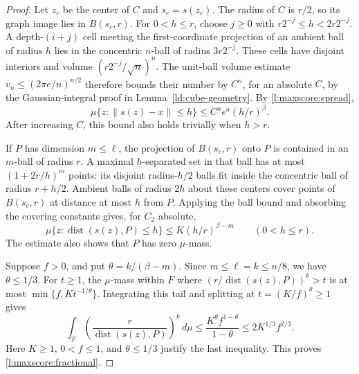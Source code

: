 \begin{proof}
Let \(z_c\) be the center of \(C\) and \(s_c=s(z_c)\).
The radius of \(C\) is \(r/2\), so its graph image lies in
\(B(s_c,r)\).  For \(0<h\le r\), choose \(j\ge0\) with
\(r2^{-j}\le h<2r2^{-j}\).  A depth-\((i+j)\) cell meeting
the first-coordinate projection of an ambient ball of radius \(h\)
lies in the concentric \(n\)-ball of radius \(3r2^{-j}\).
These cells have disjoint interiors and volume
\((r2^{-j}/\sqrt n)^n\).  The unit-ball volume estimate
\(v_n\le(2\pi e/n)^{n/2}\) therefore bounds their number by
\(C^n\), for an absolute \(C\), by the Gaussian-integral proof in
Lemma~\ref{ld:cube-geometry}.  By \eqref{l:maxscore:spread},
\begin{equation}\label{l:maxscore:ball}
 \mu\{z:\|s(z)-x\|\le h\}
 \le C^ne^a(h/r)^\beta.
\end{equation}
After increasing \(C\), this bound also holds trivially when \(h>r\).

If \(P\) has dimension \(m\le\ell\), the projection of
\(B(s_c,r)\) onto \(P\) is contained in an \(m\)-ball of radius
\(r\).  A maximal \(h\)-separated set in that ball has at most
\((1+2r/h)^m\) points: its disjoint radius-\(h/2\) balls fit
inside the concentric ball of radius \(r+h/2\).  Ambient balls of
radius \(2h\) about these centers cover points of \(B(s_c,r)\)
at distance at most \(h\) from \(P\).  Applying the ball bound and
absorbing the covering constants gives, for \(C_2\) absolute,
\begin{equation}\label{l:maxscore:tube}
 \mu\{z:\operatorname{dist}(s(z),P)\le h\}
 \le K(h/r)^{\beta-m}\qquad(0<h\le r).
\end{equation}
The estimate also shows that \(P\) has zero \(\mu\)-mass.

Suppose \(f>0\), and put \(\theta=k/(\beta-m)\).
Since \(m\le\ell=k\le n/8\), we have \(\theta\le1/3\).
For \(t\ge1\), the \(\mu\)-mass within \(F\) where
\((r/\operatorname{dist}(s(z),P))^k>t\) is at most
\(\min\{f,Kt^{-1/\theta}\}\).  Integrating this tail and splitting
at \(t=(K/f)^\theta\ge1\) gives
\[
 \int_F\left(\frac r{\operatorname{dist}(s(z),P)}\right)^k\,d\mu
 \le\frac{K^\theta f^{1-\theta}}{1-\theta}
 \le2K^{1/3}f^{2/3}.
\]
Here \(K\ge1\), \(0<f\le1\), and \(\theta\le1/3\) justify the
last inequality.  This proves \eqref{l:maxscore:fractional}.


\end{proof}

